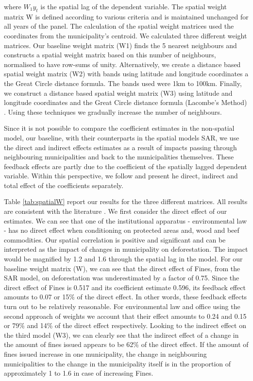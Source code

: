 where $W_{1}y_{t}$ is the spatial lag of the dependent variable. The spatial weight matrix W is defined according to various criteria and is maintained unchanged for all years of the panel. The calculation of the spatial weight matrices used the coordinates from the municipality's centroid. We calculated three different weight matrices. Our baseline weight matrix (W1) finds the 5 nearest neighbours and constructs a spatial weight matrix based on this number of neighbours, normalised to have row-sums of unity. Alternatively, we create a distance based spatial weight matrix (W2) with bands using latitude and longitude coordinates a the Great Circle distance formula. The bands used were 1km to 100km. Finally, we construct a distance based spatial weight matrix (W3) using latitude and longitude coordinates and the Great Circle distance formula (Lacombe's Method) \citep{elhorst_2012}. Using these techniques we gradually increase the number of neighbours.

Since it is not possible to compare the coefficient estimates in the non-spatial model, our baseline, with their counterparts in the spatial models SAR, we use the direct and indirect effects estimates as a result of impacts passing through neighbouring municipalities and back to the municipalities themselves. These feedback effects are partly due to the coefficient of the spatially lagged dependent variable. Within this perspective, we follow \cite{lesage_pace_2009} and present he direct, indirect and total effect of the coefficients separately.

Table \ref{tab:spatialW} report our results for the three different matrices. All results are consistent with the literature \citep{LAMBIN1, LAMBIN2}. We first consider the direct effect of our estimates. We can see that one of the institutional apparatus - environmental law - has no direct effect when conditioning on protected areas and, wood and beef commodities. Our spatial correlation is positive and significant and can be interpreted as the impact of changes in municipality on deforestation. The impact would be magnified by 1.2 and 1.6 through the spatial lag in the model. For our baseline weight matrix (W), we can see that the direct effect of Fines, from the SAR model, on deforestation was underestimated by a factor of 0.75. Since the direct effect of Fines is 0.517 and its coefficient estimate 0.596, its feedback effect
amounts to 0.07 or 15\% of the direct effect. In other words, these feedback effects turn out to be relatively reasonable. For environmental law and office using the second approach of weights we account that their effect amounts to 0.24 and 0.15 or 79\% and 14\% of the direct effect respectively. Looking to the indirect effect on the third model (W3), we can clearly see that the indirect effect of a change in the amount of fines issued appears to be 62\% of the direct effect. If the amount of fines issued increase in one municipality, the change in neighbouring municipalities to the change in the municipality itself is in the proportion of approximately 1 to 1.6 in case of increasing Fines. 

